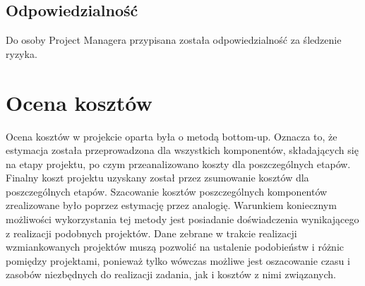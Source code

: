 \subsection{Odpowiedzialność}
Do osoby Project Managera przypisana została odpowiedzialność za śledzenie ryzyka. 
\section{Ocena kosztów}
Ocena kosztów w projekcie oparta była o metodą bottom-up. Oznacza to, że estymacja została przeprowadzona dla wszystkich komponentów, składających się na etapy projektu, po czym przeanalizowano koszty dla poszczególnych etapów. Finalny koszt projektu uzyskany został przez zsumowanie kosztów dla poszczególnych etapów.
Szacowanie kosztów poszczególnych komponentów zrealizowane było poprzez estymację przez analogię. Warunkiem koniecznym możliwości wykorzystania tej metody jest posiadanie doświadczenia wynikającego z realizacji podobnych projektów. Dane zebrane w trakcie realizacji wzmiankowanych projektów muszą pozwolić na ustalenie podobieństw i różnic pomiędzy projektami, ponieważ tylko wówczas możliwe jest oszacowanie czasu i zasobów niezbędnych do realizacji zadania, jak i kosztów z nimi związanych.  